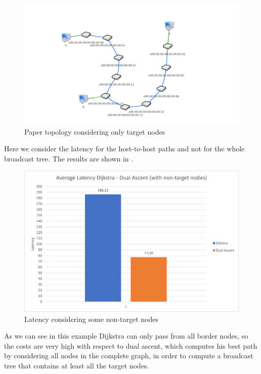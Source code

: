\begin{figure}[bht]
	\centering
	\includegraphics[width=\textwidth]{img/paper-topo-onlytarget.png}
	\caption{Paper topology considering only target
	nodes}\label{fig:paper-target}
\end{figure}

Here we consider the latency for the host-to-host paths and not for
the whole broadcast tree. The results are shown in
.

\begin{figure}
	\centering
	\includegraphics[width=\textwidth]{img/lat-mean-target.png}
	\caption{Latency considering some non-target
	nodes}\label{fig:lat-mean-target}
\end{figure}

As we can see in this example Dijkstra can only pass from all border nodes, so
the costs are very high with respect to dual ascent, which computes his best
path by considering all nodes in the complete graph, in order to compute a
broadcast tree that contains at least all the target nodes.
